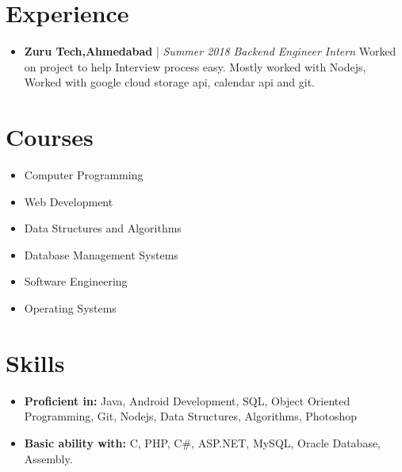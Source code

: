 \documentclass[11pt,a4paper,sans]{moderncv}        %
\begin{document}
\section{Experience}
\vspace{6pt}
\begin{itemize}
\item \textbf{Zuru Tech,Ahmedabad} | \textit{Summer 2018} \vspace{3pt}\newline
\textit{Backend Engineer Intern} \newline
\small{Worked on project to help Interview process easy.} \newline
\small{Mostly worked with Nodejs, Worked with google cloud storage api, calendar api and git.} \vspace{6pt}
\end{itemize}

\section{Courses}
\vspace{6pt}
\begin{itemize}
\item Computer Programming\vspace{4pt}
\item Web Development\vspace{4pt}
\item Data Structures and Algorithms \vspace{4pt}
\item Database Management Systems\vspace{4pt}
\item Software Engineering\vspace{4pt}
\item Operating Systems\vspace{6pt}
\end{itemize}
 		

\section{Skills}
\vspace{6pt}
\begin{itemize}
\item \textbf{Proficient in:} Java, Android Development, SQL, Object Oriented Programming, Git,  Nodejs, Data Structures, Algorithms, Photoshop\vspace{4pt}
\item \textbf{Basic ability with:} C, PHP, C\#, ASP.NET, MySQL, Oracle Database, Assembly.

\vspace{6pt}
\end{itemize} 		
\end{document}
